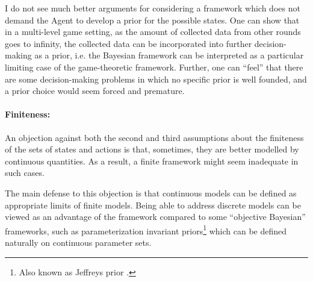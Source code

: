 \documentclass{article}
\begin{document}
I do not see much better arguments for considering a framework which does not demand the Agent to develop a prior for the possible states. One can show that in a multi-level game setting, as the amount of collected data from other rounds goes to infinity, the collected data can be incorporated into further decision-making as a prior, i.e. the Bayesian framework can be interpreted as a particular limiting case of the game-theoretic framework. Further, one can ``feel'' that there are some decision-making problems in which no specific prior is well founded, and a prior choice would seem forced and premature.

\paragraph{Finiteness:}
An objection against both the second and third assumptions about the finiteness of the sets of states and actions is that, sometimes, they are better modelled by continuous quantities. As a result, a finite framework might seem inadequate in such cases.

The main defense to this objection is that continuous models can be defined as appropriate limits of finite models. Being able to address discrete models can be viewed as an advantage of the framework compared to some ``objective Bayesian'' frameworks, such as parameterization invariant priors\footnote{Also known as Jeffreys prior \cite{book:Jaynes,paper:JeffreysPriorOriginal}.} which can be defined naturally on continuous parameter sets.
\end{document}
